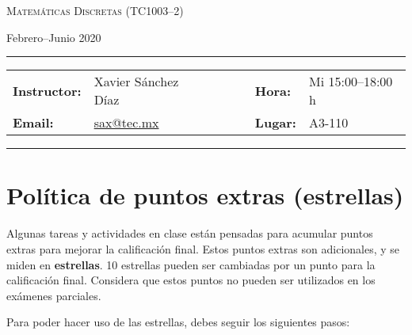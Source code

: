 \documentclass[12pt, letterpaper, oneside]{article}
\makeatletter
\newcommand{\thecourse}{Matemáticas Discretas (TC1003--2)}
\newcommand{\thesemester}{Febrero--Junio 2020}
\newcommand{\theinstructor}{Xavier Sánchez Díaz}
\newcommand{\themail}{sax@tec.mx}
\newcommand{\thetime}{Mi 15:00--18:00 h}
\newcommand{\theplace}{A3-110}
\makeatother
\begin{document}
  \begin{center}
  {\Large \textsc{\thecourse}}
  \end{center}
  \begin{center}
  \thesemester
  \end{center}

  \begin{center}
  \rule{6in}{0.4pt}
  \begin{minipage}[t]{.75\textwidth}
  \begin{tabular}{llcccll}
  \textbf{Instructor:} & \theinstructor & & &  & \textbf{Hora:} & \thetime \\
  \textbf{Email:} &  \href{mailto:sax@tec.mx}{\themail} & & & & \textbf{Lugar:} & \theplace
  \end{tabular}
  \end{minipage}
  \rule{6in}{0.4pt}
  \end{center}
  \vspace{.5cm}
  \setlength{\unitlength}{1in}
  \renewcommand{\arraystretch}{2}

  \section{Política de puntos extras (estrellas)}

  Algunas tareas y actividades en clase están pensadas para acumular puntos extras para mejorar la calificación final.
  Estos puntos extras son adicionales, y se miden en \textbf{estrellas}.
  10 estrellas pueden ser cambiadas por un punto para la calificación final.
  Considera que estos puntos no pueden ser utilizados en los exámenes parciales.

  Para poder hacer uso de las estrellas, debes seguir los siguientes pasos:
\end{document}
